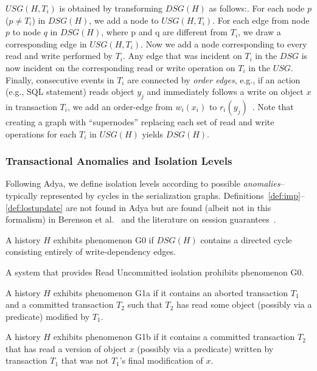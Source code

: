 $USG(H, T_i)$ is obtained by transforming $DSG(H)$ as follows:.  For
each node $p$ ($p \neq T_i$) in $DSG(H)$, we add a node to
$USG(H,T_i)$. For each edge from node $p$ to node $q$ in $DSG(H)$,
where p and q are different from $T_i$, we draw a corresponding edge
in $USG(H,T_i)$. Now we add a node corresponding to every read and
write performed by $T_i$. Any edge that was incident on $T_i$ in the
$DSG$ is now incident on the corresponding read or write operation on
$T_i$ in the $USG$. Finally, consecutive events in $T_i$ are connected
by \textit{order edges}, e.g., if an action (e.g., SQL statement)
reads object $y_j$ and immediately follows a write on object $x$ in
transaction $T_i$, we add an order-edge from $w_i(x_i)$ to
$r_i(y_j)$~\cite[Section 4.2.1]{adya}. Note that creating a graph
with ``supernodes'' replacing each set of read and write operations
for each $T_i$ in $USG(H)$ yields $DSG(H)$.

\subsubsection{Transactional Anomalies and Isolation Levels}
\label{sec:anomalies-hat}

Following Adya, we define isolation levels according to
possible \textit{anomalies}--typically represented by cycles in the
serialization graphs. Definitions~\ref{def:imp}--\ref{def:lostupdate}
are not found in Adya but are found (albeit not in this formalism) in
Berenson et al.~\cite{ansicritique} and the literature on session
guarantees~\cite{sessionguarantees, vogels-defs}.

\begin{definition}
A history $H$ exhibits phenomenon G0 if $DSG(H)$ contains a directed
cycle consisting entirely of write-dependency edges.
\end{definition}

\begin{definition}
A system that provides Read Uncommitted isolation prohibits phenomenon G0.
\end{definition}

\begin{definition}
A history $H$ exhibits phenomenon G1a if it contains an aborted
transaction $T_1$ and a committed transaction $T_2$ such that $T_2$ has read
some object (possibly via a predicate) modified by $T_1$.
\end{definition}

\begin{definition}
  A history $H$ exhibits phenomenon G1b if it contains a committed
  transaction $T_2$ that has read a version of object $x$ (possibly
  via a predicate) written by transaction $T_1$ that was not $T_1$'s
  final modification of $x$.
\end{definition}

